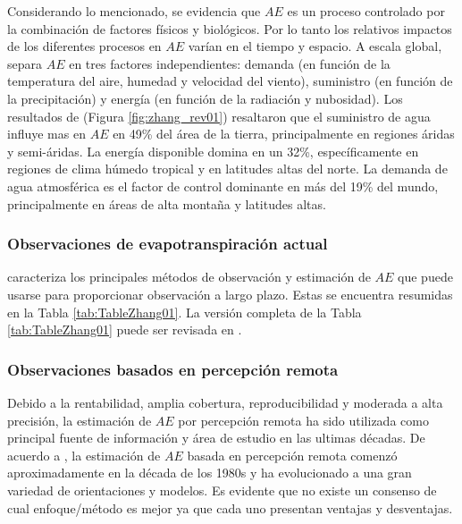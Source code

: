 \documentclass[12pt]{article}
\begin{document}
Considerando lo mencionado, se evidencia que $AE$ es un proceso controlado por la combinación de factores físicos y biológicos. Por lo tanto los relativos impactos de los diferentes procesos en $AE$ varían en el tiempo y espacio. A escala global, \citet{zhang2015vegetation} separa $AE$ en tres factores independientes: demanda (en función de la temperatura del aire, humedad y velocidad del viento), suministro (en función de la precipitación) y energía (en función de la radiación y nubosidad). Los resultados de \citet{zhang2015vegetation} (Figura \ref{fig:zhang_rev01}) resaltaron que el suministro de agua influye mas en $AE$ en 49\% del área de la tierra, principalmente en regiones áridas y semi-áridas. La energía disponible domina en un 32\%, específicamente en regiones de clima húmedo tropical y en latitudes altas del norte. La demanda de agua atmosférica es el factor de control dominante en más del 19\% del mundo, principalmente en áreas de alta montaña y latitudes altas. 



\subsubsection{Observaciones de evapotranspiración actual}

\citet{wang2012review} caracteriza los principales métodos de observación y estimación de $AE$ que puede usarse para proporcionar observación a largo plazo. Estas se encuentra resumidas en la Tabla \ref{tab:TableZhang01}. La versión completa de la Tabla \ref{tab:TableZhang01} puede ser revisada en \citet{wang2012review}.
 


\subsubsection{Observaciones basados en percepción remota}

Debido a la rentabilidad, amplia cobertura, reproducibilidad y moderada a alta precisión, la estimación de $AE$ por percepción remota ha sido utilizada como principal fuente de información y área de estudio en las ultimas décadas. De acuerdo a \citet{zhang2016review}, la estimación de $AE$ basada en percepción remota comenzó aproximadamente en la década de los 1980s y ha evolucionado a una gran variedad de orientaciones y modelos. Es evidente que no existe un consenso de cual enfoque/método es mejor ya que cada uno presentan ventajas y desventajas. 
\end{document}

